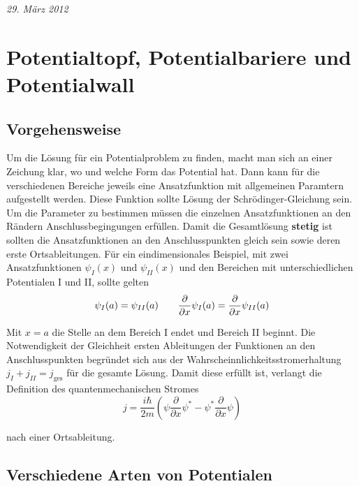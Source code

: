 
\graphicspath{{sgl_potential_pics/}}%



\textit{29. März 2012}

\setcounter{section}{1}
\section*{Potentialtopf, Potentialbariere und Potentialwall}

\subsection*{Vorgehensweise}

Um die Lösung für ein Potentialproblem zu finden, macht man sich an einer Zeichung klar, wo und welche Form das Potential hat. Dann kann für die verschiedenen Bereiche jeweils eine Ansatzfunktion mit allgemeinen Paramtern aufgestellt werden. Diese Funktion sollte Lösung der Schrödinger-Gleichung sein. Um die Parameter zu bestimmen müssen die einzelnen Ansatzfunktionen an den Rändern Anschlussbegingungen erfüllen. Damit die Gesamtlösung \textbf{stetig} ist sollten die Ansatzfunktionen an den Anschlusspunkten gleich sein sowie deren erste Ortsableitungen. Für ein eindimensionales Beispiel, mit zwei Ansatzfunktionen \(\psi_I(x)\) und \(\psi_{II}(x)\) und den Bereichen mit unterschiedlichen Potentialen I und II, sollte gelten
\begin{equation}
  \label{eq:15}
  \psi_I(a) = \psi_{II}(a)\qquad  \pdiff_x \psi_I(a) = \pdiff_x \psi_{II}(a)
\end{equation}

Mit \(x=a\) die Stelle an dem Bereich I endet und Bereich II beginnt. Die Notwendigkeit der Gleichheit ersten Ableitungen der Funktionen an den Anschlusspunkten begründet sich aus der Wahrscheinnlichkeitsstromerhaltung \(j_I+j_{II}=j_{\text{ges}}\) für die gesamte Lösung. Damit diese erfüllt ist, verlangt die Definition des quantenmechanischen Stromes
\begin{equation}
  \label{eq:17}
  j = \frac{i\hbar}{2m}\left(\psi \frac{\partial}{\partial x} \psi^* - \psi^* \frac{\partial}{\partial x}\psi\right)
\end{equation}

nach einer Ortsableitung.

\subsection*{Verschiedene Arten von Potentialen}

